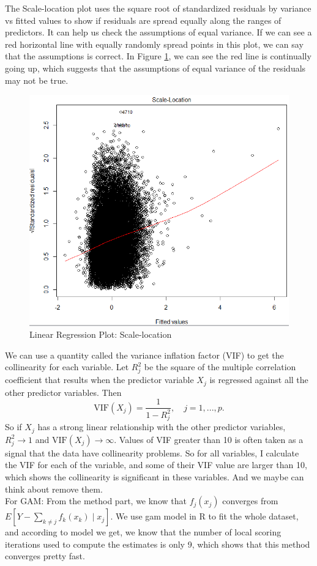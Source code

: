 \documentclass[11pt]{article}
\begin{document}
    The Scale-location plot uses the square root of standardized residuals by variance vs fitted values to show if residuals are spread equally along the ranges of predictors. It can help us check the assumptions of equal variance. If we can see a red horizontal line with equally randomly spread points in this plot, we can say that the assumptions is correct. In Figure \ref{fig:sclo}, we can see the red line is continually going up, which suggests that the assumptions of equal variance of the residuals may not be true.  \\
    
    \begin{figure}[h]
        \centering
        \includegraphics[width=0.5\linewidth]{linear_sl.png}
        \caption{Linear Regression Plot: Scale-location}
        \label{fig:sclo}
    \end{figure}
    
    We can use a quantity called the variance inflation factor (VIF) to get the collinearity for each variable. Let $R^2_j$ be the square of the multiple correlation coefficient that results when the predictor variable $X_j$ is regressed against all the other predictor variables. Then $$\text{VIF}(X_j) = \frac{1}{1 - R^2_j}, \quad j = 1, ... , p.$$ So if $X_j$ has a strong linear relationship with the other predictor variables, $R^2_j \to 1$ and $\text{VIF}(X_j) \to \infty$. Values of VIF greater than 10 is often taken as a signal that the data have collinearity problems.\cite{vif} So for all variables, I calculate the VIF for each of the variable, and some of their VIF value are larger than 10, which shows the collinearity is significant in these variables. And we maybe can think about remove them. \\ 
    
For GAM: From the method part, we know that $f_j(x_j)$ converges from $E \left[Y-\sum_{k \neq j}f_k(x_k)\mid{x_j} \right]$. We use gam model in R to fit the whole dataset, and according to model we get, we know that the number of local scoring iterations used to compute the estimates is only 9, which shows that this method converges pretty fast.
\end{document}
